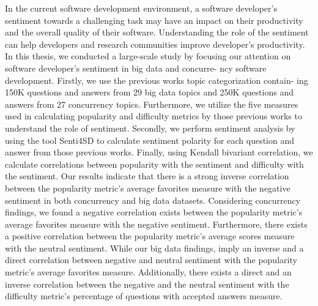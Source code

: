 In the current software development environment, a software developer's sentiment towards a challenging task may have an impact on their productivity and the overall quality of their software. Understanding the role of the sentiment can help developers and research communities improve developer's productivity. In this thesis, we conducted a large-scale study by focusing our attention on software developer's sentiment in big data and concurre- ncy software development. Firstly, we use the previous works topic categorization contain- ing 150K questions and answers from 29 big data topics and 250K questions and answers from 27 concurrency topics. Furthermore, we utilize the five measures used in calculating popularity and difficulty metrics by those previous works to understand the role of sentiment. Secondly, we perform sentiment analysis by using the tool Senti4SD to calculate sentiment polarity for each question and answer from those previous works. Finally, using Kendall bivariant correlation, we calculate correlations between popularity with the sentiment and difficulty with the sentiment. Our results indicate that there is a strong inverse correlation between the popularity metric's average favorites measure with the negative sentiment in both concurrency and big data datasets. Considering concurrency findings, we found a negative correlation exists between the popularity metric's average favorites measure with the negative sentiment. Furthermore, there exists a positive correlation between the popularity metric's average scores measure with the neutral sentiment. While our big data findings, imply an inverse and a direct correlation between negative and neutral sentiment with the popularity metric's average favorites measure. Additionally, there exists a direct and an inverse correlation between the negative and the neutral sentiment with the difficulty metric's percentage of questions with accepted answers measure. 


